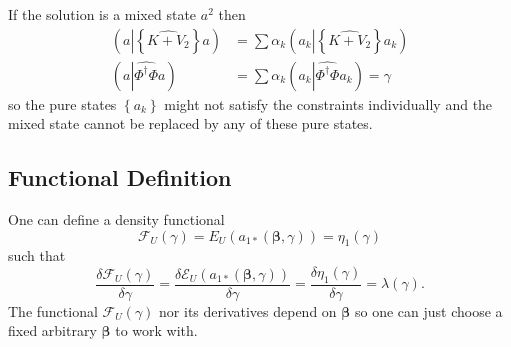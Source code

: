 \documentclass[aps,preprint]{revtex4}%
\begin{document}
If the solution is a mixed state $a^{2}$ then
\begin{align}
\left(  a\left\vert \left\{  \widehat{K+V_{2}}\right\}  \right.  a\right)   &
=\sum\alpha_{k}\left(  a_{k}\left\vert \left\{  \widehat{K+V_{2}}\right\}
\right.  a_{k}\right) \nonumber\\
\left(  a\left\vert \widehat{\Phi^{\dagger}\Phi}\right.  a\right)   &
=\sum\alpha_{k}\left(  a_{k}\left\vert \widehat{\Phi^{\dagger}\Phi}\right.
a_{k}\right)  =\gamma
\end{align}
so the pure states $\left\{  a_{k}\right\}  $ might not satisfy the
constraints individually and the mixed state cannot be replaced by any of
these pure states.

\subsection{Functional Definition}

One can define a density functional
\begin{equation}
\mathcal{F}_{U}\left(  \gamma\right)  =E_{U}\left(  a_{1\ast}\left(
\mathbf{\beta,}\gamma\right)  \right)  =\eta_{1}\left(  \gamma\right)
\end{equation}
such that
\begin{equation}
\frac{\delta\mathcal{F}_{U}\left(  \gamma\right)  }{\delta\gamma}=\frac
{\delta\mathcal{E}_{U}\left(  a_{1\ast}\left(  \mathbf{\beta,}\gamma\right)
\right)  }{\delta\gamma}=\frac{\delta\eta_{1}\left(  \gamma\right)  }%
{\delta\gamma}=\lambda\left(  \gamma\right)  .
\end{equation}
The functional $\mathcal{F}_{U}\left(  \gamma\right)  $ nor its derivatives
depend on $\mathbf{\beta}$ so one can just choose a fixed arbitrary
$\mathbf{\beta}$ to work with.
\end{document}
